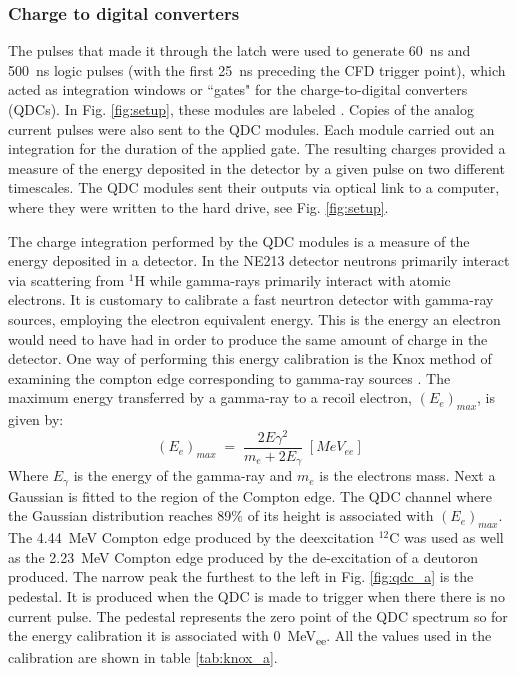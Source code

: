 \documentclass[main.tex]{subfiles}
\begin{document}
\subsubsection{Charge to digital converters}
The pulses that made it through the latch were used to generate \SI{60}{\ns} and \SI{500}{\ns} logic pulses (with the first \SI{25}{\ns} preceding the CFD trigger point), which acted as integration windows or ``gates" for the charge-to-digital converters (QDCs). In Fig. \ref{fig:setup}, these modules are labeled . Copies of the analog current pulses were also sent to the QDC modules. Each module carried out an integration for the duration of the applied gate. The resulting charges provided a measure of the energy deposited in the detector by a given pulse on two different timescales. The QDC modules sent their outputs via optical link to a computer, where they were written to the hard drive, see Fig. \ref{fig:setup}.

The charge integration performed by the QDC modules is a measure of the energy deposited in a detector. In the NE213 detector neutrons primarily interact via scattering from $^1$H while gamma-rays primarily interact with atomic electrons. It is customary to calibrate a fast neurtron detector with gamma-ray sources, employing the electron equivalent energy. This is the energy an electron would need to have had in order to produce the same amount of charge in the detector. One way of performing this energy calibration is the Knox method of examining the compton edge corresponding to gamma-ray sources \cite{Nilsson}. The maximum energy transferred by a gamma-ray to a recoil electron, $(E_e)_{max}$, is given by:
\begin{equation}
	(E_{e})_{max}\;=\;\frac{2E\gamma^2}{m_e + 2E_\gamma} \;[MeV_{ee}]
\end{equation}
Where $E_\gamma$ is the energy of the gamma-ray and $m_e$ is the electrons mass.
Next a Gaussian is fitted to the region of the Compton edge. The QDC channel where the Gaussian distribution reaches 89\% of its height is associated with $(E_e)_{max}$. The \SI{4.44}{MeV} Compton edge produced by the deexcitation $^{12}$C was used as well as the \SI{2.23}{MeV} Compton edge produced by the de-excitation of a deutoron produced.
 The narrow peak the furthest to the left in Fig. \ref{fig:qdc_a} is the pedestal. It is produced when the QDC is made to trigger when there there is no current pulse. The pedestal represents the zero point of the QDC spectrum so for the energy calibration it is associated with \SI{0}{MeV_{ee}}. All the values used in the calibration are shown in table \ref{tab:knox_a}.
\end{document}
